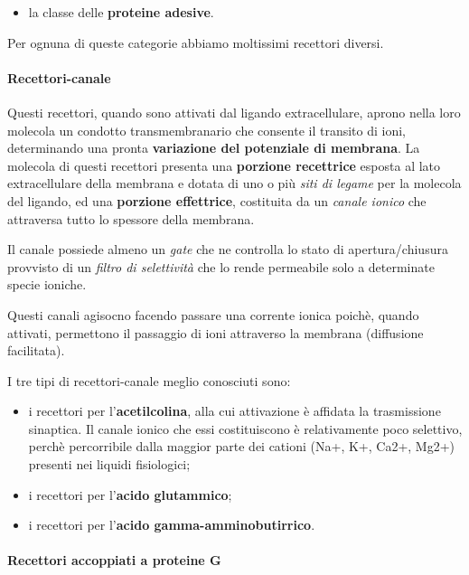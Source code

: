 \documentclass[]{article}
\begin{document}
\begin{itemize}
\itemsep1pt\parskip0pt
\item
  la classe delle \textbf{proteine adesive}.
\end{itemize}

Per ognuna di queste categorie abbiamo moltissimi recettori diversi.

\paragraph{Recettori-canale}\label{recettori-canale}

Questi recettori, quando sono attivati dal ligando extracellulare,
aprono nella loro molecola un condotto transmembranario che consente il
transito di ioni, determinando una pronta \textbf{variazione del
potenziale di membrana}. La molecola di questi recettori presenta una
\textbf{porzione recettrice} esposta al lato extracellulare della
membrana e dotata di uno o più \emph{siti di legame} per la molecola del
ligando, ed una \textbf{porzione effettrice}, costituita da un
\emph{canale ionico} che attraversa tutto lo spessore della membrana.

Il canale possiede almeno un \emph{gate} che ne controlla lo stato di
apertura/chiusura provvisto di un \emph{filtro di selettività} che lo
rende permeabile solo a determinate specie ioniche.

Questi canali agisocno facendo passare una corrente ionica poichè,
quando attivati, permettono il passaggio di ioni attraverso la membrana
(diffusione facilitata).

I tre tipi di recettori-canale meglio conosciuti sono:

\begin{itemize}
\itemsep1pt\parskip0pt
\item
  i recettori per l'\textbf{acetilcolina}, alla cui attivazione è
  affidata la trasmissione sinaptica. Il canale ionico che essi
  costituiscono è relativamente poco selettivo, perchè percorribile
  dalla maggior parte dei cationi (Na+, K+, Ca2+, Mg2+) presenti nei
  liquidi fisiologici;
\item
  i recettori per l'\textbf{acido glutammico};
\item
  i recettori per l'\textbf{acido gamma-amminobutirrico}.
\end{itemize}

\paragraph{Recettori accoppiati a proteine
G}\label{recettori-accoppiati-a-proteine-g}
\end{document}
